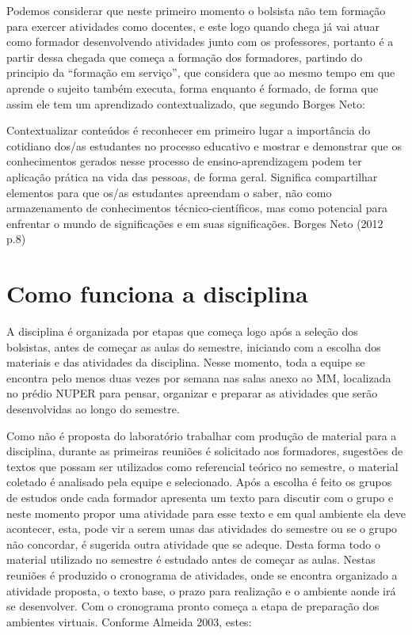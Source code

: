Podemos considerar que neste primeiro momento o bolsista não tem formação para exercer atividades como docentes, e este logo quando chega já vai atuar como formador desenvolvendo atividades junto com os professores, portanto é a partir dessa chegada que começa a formação dos formadores, partindo do principio da ``formação em serviço'', que considera que ao mesmo tempo em que aprende o sujeito também executa, forma enquanto é formado, de forma que assim ele tem um aprendizado contextualizado, que segundo Borges Neto:

\begin{citacao}
Contextualizar conteúdos é reconhecer em primeiro lugar a importância do cotidiano dos/as estudantes no processo educativo e mostrar e demonstrar que os conhecimentos gerados nesse processo de ensino-aprendizagem podem ter aplicação prática na vida das pessoas, de forma geral. Significa compartilhar elementos para que os/as estudantes apreendam o saber, não como armazenamento de conhecimentos técnico-científicos, mas como potencial para enfrentar o mundo de significações e em suas significações.  Borges Neto (2012 p.8)
\end{citacao}

\section{Como funciona a disciplina}

A disciplina é organizada por etapas que começa logo após a seleção dos bolsistas, antes de começar as aulas do semestre, iniciando com a escolha dos materiais e das atividades da disciplina. Nesse momento, toda a equipe se encontra pelo menos duas vezes por semana nas salas anexo ao MM, localizada no prédio NUPER para pensar, organizar e preparar as atividades que serão desenvolvidas ao longo do semestre.

Como não é proposta do laboratório trabalhar com produção de material para a disciplina, durante as primeiras reuniões é solicitado aos formadores, sugestões de textos que possam ser utilizados como referencial teórico no semestre, o material coletado é analisado pela equipe e selecionado. Após a escolha é feito os grupos de estudos onde cada formador apresenta um texto para discutir com o grupo e neste momento propor uma atividade para esse texto e em qual ambiente ela deve acontecer, esta, pode vir a serem umas das atividades do semestre ou se o grupo não concordar, é sugerida outra atividade que se adeque. Desta forma todo o material utilizado no semestre é estudado antes de começar as aulas. Nestas reuniões é produzido o cronograma de atividades, onde se encontra organizado a atividade proposta, o texto base, o prazo para realização e o ambiente aonde irá se desenvolver. Com o cronograma pronto começa a etapa de preparação dos ambientes virtuais. Conforme Almeida 2003, estes:

